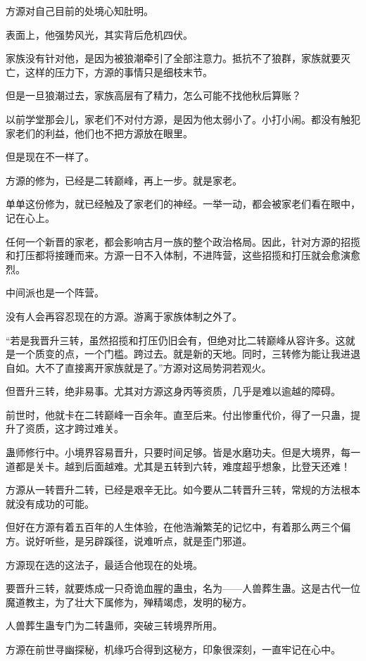 \begin{this_body}
方源对自己目前的处境心知肚明。

表面上，他强势风光，其实背后危机四伏。

家族没有针对他，是因为被狼潮牵引了全部注意力。抵抗不了狼群，家族就要灭亡，这样的压力下，方源的事情只是细枝末节。

但是一旦狼潮过去，家族高层有了精力，怎么可能不找他秋后算账？

以前学堂那会儿，家老们不对付方源，是因为他太弱小了。小打小闹。都没有触犯家老们的利益，他们也不把方源放在眼里。

但是现在不一样了。

方源的修为，已经是二转巅峰，再上一步。就是家老。

单单这份修为，就已经触及了家老们的神经。一举一动，都会被家老们看在眼中，记在心上。

任何一个新晋的家老，都会影响古月一族的整个政治格局。因此，针对方源的招揽和打压都将接踵而来。方源一日不入体制，不进阵营，这些招揽和打压就会愈演愈烈。

中间派也是一个阵营。

没有人会再容忍现在的方源。游离于家族体制之外了。

“若是我晋升三转，虽然招揽和打压仍旧会有，但绝对比二转巅峰从容许多。这就是一个质变的点，一个门槛。跨过去。就是新的天地。同时，三转修为能让我进退自如。大不了直接离开家族就是了。”方源对这局势洞若观火。

但晋升三转，绝非易事。尤其对方源这身丙等资质，几乎是难以逾越的障碍。

前世时，他就卡在二转巅峰一百余年。直至后来。付出惨重代价，得了一只蛊，提升了资质，这才跨过难关。

蛊师修行中。小境界容易晋升，只要时间足够。皆是水磨功夫。但是大境界，每一道都是关卡。越到后面越难。尤其是五转到六转，难度超乎想象，比登天还难！

方源从一转晋升二转，已经是艰辛无比。如今要从二转晋升三转，常规的方法根本就没有成功的可能。

但好在方源有着五百年的人生体验，在他浩瀚繁芜的记忆中，有着那么两三个偏方。说好听些，是另辟蹊径，说难听点，就是歪门邪道。

方源现在选的这法子，最适合他现在的处境。

要晋升三转，就要炼成一只奇诡血腥的蛊虫，名为——人兽葬生蛊。这是古代一位魔道教主，为了壮大下属修为，殚精竭虑，发明的秘方。

人兽葬生蛊专门为二转蛊师，突破三转境界所用。

方源在前世寻幽探秘，机缘巧合得到这秘方，印象很深刻，一直牢记在心中。


\end{this_body}
